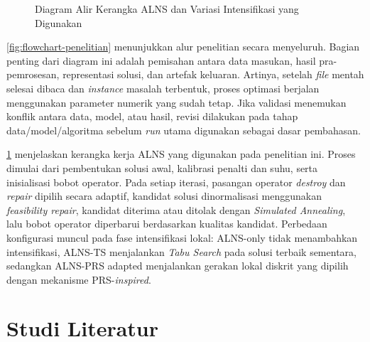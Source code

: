 \documentclass{file/TA-ITS}
\theoremstyle{definition}
\theoremstyle{definition}
\theoremstyle{plain}
\begin{document}
\begin{figure}[H]
{%
}
\caption{Diagram Alir Kerangka ALNS dan Variasi Intensifikasi yang Digunakan}
\label{fig:flowchart-alns-varian}
\end{figure}

\ref{fig:flowchart-penelitian} menunjukkan alur penelitian secara menyeluruh. Bagian penting dari diagram ini adalah pemisahan antara data masukan, hasil pra-pemrosesan, representasi solusi, dan artefak keluaran. Artinya, setelah \textit{file} mentah selesai dibaca dan \textit{instance} masalah terbentuk, proses optimasi berjalan menggunakan parameter numerik yang sudah tetap. Jika validasi menemukan konflik antara data, model, atau hasil, revisi dilakukan pada tahap data/model/algoritma sebelum \textit{run} utama digunakan sebagai dasar pembahasan.


\ref{fig:flowchart-alns-varian} menjelaskan kerangka kerja ALNS yang digunakan pada penelitian ini. Proses dimulai dari pembentukan solusi awal, kalibrasi penalti dan suhu, serta inisialisasi bobot operator. Pada setiap iterasi, pasangan operator \textit{destroy} dan \textit{repair} dipilih secara adaptif, kandidat solusi dinormalisasi menggunakan \textit{feasibility repair}, kandidat diterima atau ditolak dengan \textit{Simulated Annealing}, lalu bobot operator diperbarui berdasarkan kualitas kandidat. Perbedaan konfigurasi muncul pada fase intensifikasi lokal: ALNS-only tidak menambahkan intensifikasi, ALNS-TS menjalankan \textit{Tabu Search} pada solusi terbaik sementara, sedangkan ALNS-PRS adapted menjalankan gerakan lokal diskrit yang dipilih dengan mekanisme PRS-\textit{inspired}.

\section{Studi Literatur}
\end{document}
